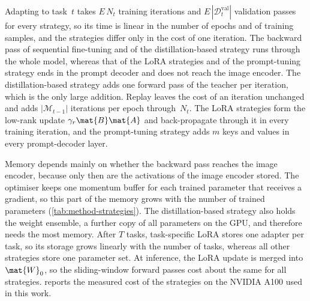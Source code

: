 Adapting to task~$t$ takes $E\,N_t$ training iterations and $E\,|\mathcal{D}_t^{\mathrm{val}}|$ validation passes for every strategy, so its time is linear in the number of epochs and of training samples, and the strategies differ only in the cost of one iteration.
The backward pass of sequential fine-tuning and of the distillation-based strategy runs through the whole model, whereas that of the LoRA strategies and of the prompt-tuning strategy ends in the prompt decoder and does not reach the image encoder.
The distillation-based strategy adds one forward pass of the teacher per iteration, which is the only large addition.
Replay leaves the cost of an iteration unchanged and adds $|\mathcal{M}_{t-1}|$ iterations per epoch through~$N_t$.
The LoRA strategies form the low-rank update $\gamma_r\mat{B}\mat{A}$ and back-propagate through it in every training iteration, and the prompt-tuning strategy adds $m$ keys and values in every prompt-decoder layer.

Memory depends mainly on whether the backward pass reaches the image encoder, because only then are the activations of the image encoder stored.
The optimiser keeps one momentum buffer for each trained parameter that receives a gradient, so this part of the memory grows with the number of trained parameters (\cref{tab:method-strategies}).
The distillation-based strategy also holds the weight ensemble, a further copy of all parameters on the GPU, and therefore needs the most memory.
After $T$ tasks, task-specific LoRA stores one adapter per task, so its storage grows linearly with the number of tasks, whereas all other strategies store one parameter set.
At inference, the LoRA update is merged into $\mat{W}_0$, so the sliding-window forward passes cost about the same for all strategies.
 reports the measured cost of the strategies on the NVIDIA A100 used in this work.
